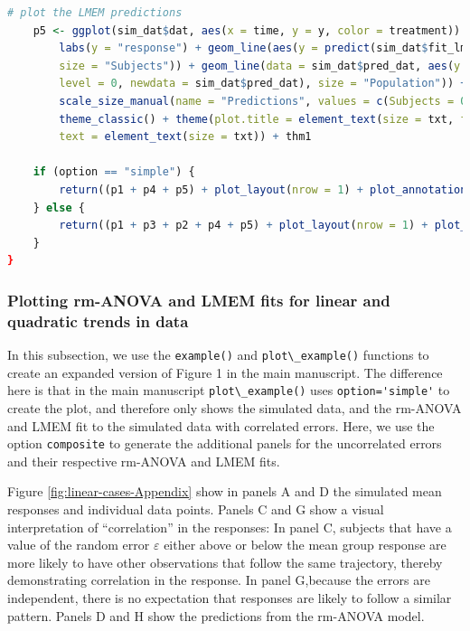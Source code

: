 \documentclass[
]{article}
\newcommand{\passthrough}[1]{#1}
\begin{document}
\begin{lstlisting}[language=R]
    # plot the LMEM predictions
    p5 <- ggplot(sim_dat$dat, aes(x = time, y = y, color = treatment)) + geom_point() +
        labs(y = "response") + geom_line(aes(y = predict(sim_dat$fit_lme), group = subject,
        size = "Subjects")) + geom_line(data = sim_dat$pred_dat, aes(y = predict(sim_dat$fit_lme,
        level = 0, newdata = sim_dat$pred_dat), size = "Population")) + guides(color = guide_legend(override.aes = list(size = 2))) +
        scale_size_manual(name = "Predictions", values = c(Subjects = 0.5, Population = 3)) +
        theme_classic() + theme(plot.title = element_text(size = txt, face = "bold"),
        text = element_text(size = txt)) + thm1

    if (option == "simple") {
        return((p1 + p4 + p5) + plot_layout(nrow = 1) + plot_annotation(tag_levels = "A"))
    } else {
        return((p1 + p3 + p2 + p4 + p5) + plot_layout(nrow = 1) + plot_annotation(tag_levels = "A"))
    }
}
\end{lstlisting}

\hypertarget{plotting-rm-anova-and-lmem-fits-for-linear-and-quadratic-trends-in-data}{%
\subsubsection{Plotting rm-ANOVA and LMEM fits for linear and quadratic trends in data}\label{plotting-rm-anova-and-lmem-fits-for-linear-and-quadratic-trends-in-data}}

In this subsection, we use the \passthrough{\lstinline!example()!} and \passthrough{\lstinline!plot\_example()!} functions to create an expanded version of Figure 1 in the main manuscript. The difference here is that in the main manuscript \passthrough{\lstinline!plot\_example()!} uses \passthrough{\lstinline!option='simple'!} to create the plot, and therefore only shows the simulated data, and the rm-ANOVA and LMEM fit to the simulated data with correlated errors. Here, we use the option \passthrough{\lstinline!composite!} to generate the additional panels for the uncorrelated errors and their respective rm-ANOVA and LMEM fits.

Figure \ref{fig:linear-cases-Appendix} show in panels A and D the simulated mean responses and individual data points. Panels C and G show a visual interpretation of ``correlation'' in the responses: In panel C, subjects that have a value of the random error \(\varepsilon\) either above or below the mean group response are more likely to have other observations that follow the same trajectory, thereby demonstrating correlation in the response. In panel G,because the errors are independent, there is no expectation that responses are likely to follow a similar pattern. Panels D and H show the predictions from the rm-ANOVA model.
\end{document}
